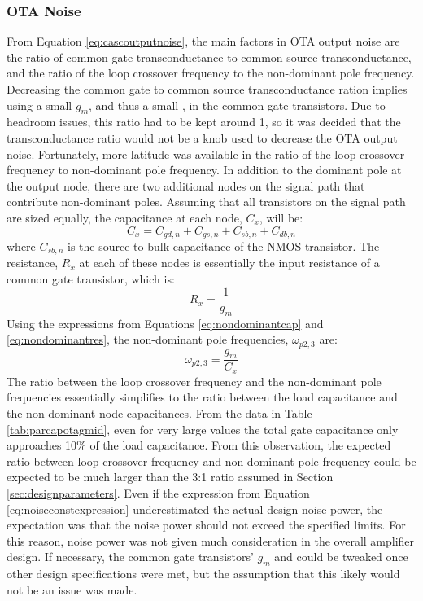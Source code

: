 \subsubsection{OTA Noise} 
\label{sec:realotanoise}
From Equation \ref{eq:cascoutputnoise}, the main factors in OTA output noise are the ratio of common gate transconductance to common source transconductance, and the ratio of the loop crossover frequency to the non-dominant pole frequency. Decreasing the common gate to common source transconductance ration implies using a small $g_{m}$, and thus a small \gmid, in the common gate transistors. Due to headroom issues, this ratio had to be kept around 1, so it was decided that the transconductance ratio would not be a knob used to decrease the OTA output noise. Fortunately, more latitude was available in the ratio of the loop crossover frequency to non-dominant pole frequency. In addition to the dominant pole at the output node, there are two additional nodes on the signal path that contribute non-dominant poles. Assuming that all transistors on the signal path are sized equally, the capacitance at each node, $C_{x}$, will be:
\begin{equation}
\label{eq:nondominantcap}
C_{x} = C_{gd,n} + C_{gs,n} + C_{sb,n} + C_{db,n}
\end{equation}
where $C_{sb,n}$ is the source to bulk capacitance of the NMOS transistor. The resistance, $R_{x}$ at each of these nodes is essentially the input resistance of a common gate transistor, which is:
\begin{equation}
\label{eq:nondominantres}
R_{x} = \dfrac{1}{g_{m}}
\end{equation}
Using the expressions from Equations \ref{eq:nondominantcap} and \ref{eq:nondominantres}, the non-dominant pole frequencies, $\omega_{p2,3}$ are:
\begin{equation}
\omega_{p2,3} = \dfrac{g_{m}}{C_{x}} 
\end{equation}
The ratio between the loop crossover frequency and the non-dominant pole frequencies essentially simplifies to the ratio between the load capacitance and the non-dominant node capacitances. From the data in Table \ref{tab:parcapotagmid}, even for very large \gmid\spc values the total gate capacitance only approaches 10\% of the load capacitance. From this observation, the expected ratio between loop crossover frequency and non-dominant pole frequency could be expected to be much larger than the 3:1 ratio assumed in Section \ref{sec:designparameters}. Even if the expression from Equation \ref{eq:noiseconstexpression} underestimated the actual design noise power, the expectation was that the noise power should not exceed the specified limits. For this reason, noise power was not given much consideration in the overall amplifier design. If necessary, the common gate transistors' $g_{m}$ and \transit\spc could be tweaked once other design specifications were met, but the assumption that this likely would not be an issue was made.
